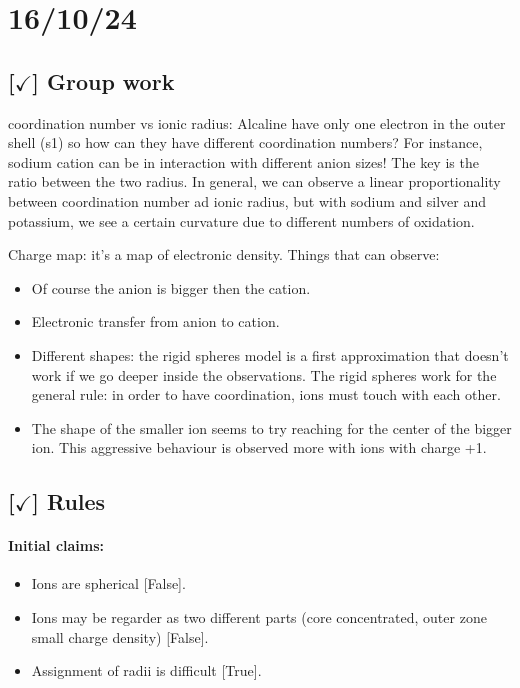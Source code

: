\section{16/10/24}

\subsection{[$\checkmark$] Group work}
coordination number vs ionic radius:
Alcaline have only one electron in the outer shell (s1) so how can they have different coordination numbers? For instance, sodium cation can be in interaction with different anion sizes! The key is the ratio between the two radius.
In general, we can observe a linear proportionality between coordination number ad  ionic radius, but with sodium and silver  and potassium, we see a certain curvature due to different
numbers of oxidation.

Charge map: it's a map of electronic density. Things that can observe:
\begin{itemize}
    \item Of course the anion is bigger then the cation. 
    \item Electronic transfer from anion to cation.
    \item Different shapes: the rigid spheres model is a first approximation that doesn't work if we go deeper inside the observations. The rigid spheres work for the general rule: in order to have coordination, ions must touch with each other.
    \item The shape of the smaller ion seems to try reaching for the center of the bigger ion. This aggressive behaviour is observed more with ions with charge +1.
\end{itemize}

\subsection{[$\checkmark$] Rules}

\paragraph{Initial claims: }

\begin{itemize}
    \item Ions are spherical [False].
    \item Ions may be regarder as two different parts (core concentrated, outer zone small charge density) [False].
    \item Assignment of radii is difficult [True].
\end{itemize}

